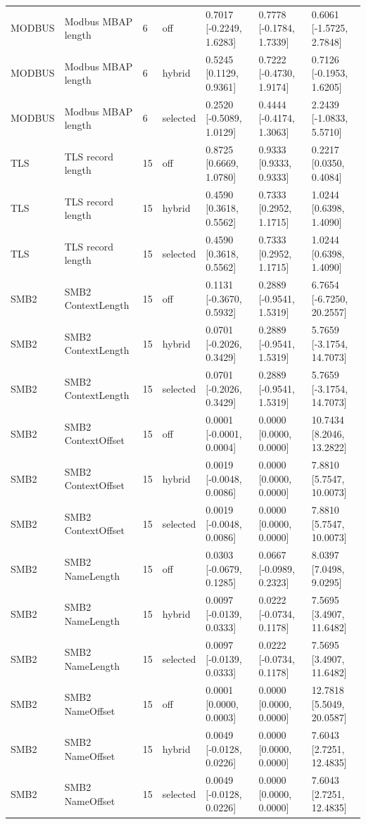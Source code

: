 \begin{tabular}{lllllll}
MODBUS & Modbus MBAP length & 6 & off & 0.7017 [-0.2249, 1.6283] & 0.7778 [-0.1784, 1.7339] & 0.6061 [-1.5725, 2.7848] \\
MODBUS & Modbus MBAP length & 6 & hybrid & 0.5245 [0.1129, 0.9361] & 0.7222 [-0.4730, 1.9174] & 0.7126 [-0.1953, 1.6205] \\
MODBUS & Modbus MBAP length & 6 & selected & 0.2520 [-0.5089, 1.0129] & 0.4444 [-0.4174, 1.3063] & 2.2439 [-1.0833, 5.5710] \\
TLS & TLS record length & 15 & off & 0.8725 [0.6669, 1.0780] & 0.9333 [0.9333, 0.9333] & 0.2217 [0.0350, 0.4084] \\
TLS & TLS record length & 15 & hybrid & 0.4590 [0.3618, 0.5562] & 0.7333 [0.2952, 1.1715] & 1.0244 [0.6398, 1.4090] \\
TLS & TLS record length & 15 & selected & 0.4590 [0.3618, 0.5562] & 0.7333 [0.2952, 1.1715] & 1.0244 [0.6398, 1.4090] \\
SMB2 & SMB2 ContextLength & 15 & off & 0.1131 [-0.3670, 0.5932] & 0.2889 [-0.9541, 1.5319] & 6.7654 [-6.7250, 20.2557] \\
SMB2 & SMB2 ContextLength & 15 & hybrid & 0.0701 [-0.2026, 0.3429] & 0.2889 [-0.9541, 1.5319] & 5.7659 [-3.1754, 14.7073] \\
SMB2 & SMB2 ContextLength & 15 & selected & 0.0701 [-0.2026, 0.3429] & 0.2889 [-0.9541, 1.5319] & 5.7659 [-3.1754, 14.7073] \\
SMB2 & SMB2 ContextOffset & 15 & off & 0.0001 [-0.0001, 0.0004] & 0.0000 [0.0000, 0.0000] & 10.7434 [8.2046, 13.2822] \\
SMB2 & SMB2 ContextOffset & 15 & hybrid & 0.0019 [-0.0048, 0.0086] & 0.0000 [0.0000, 0.0000] & 7.8810 [5.7547, 10.0073] \\
SMB2 & SMB2 ContextOffset & 15 & selected & 0.0019 [-0.0048, 0.0086] & 0.0000 [0.0000, 0.0000] & 7.8810 [5.7547, 10.0073] \\
SMB2 & SMB2 NameLength & 15 & off & 0.0303 [-0.0679, 0.1285] & 0.0667 [-0.0989, 0.2323] & 8.0397 [7.0498, 9.0295] \\
SMB2 & SMB2 NameLength & 15 & hybrid & 0.0097 [-0.0139, 0.0333] & 0.0222 [-0.0734, 0.1178] & 7.5695 [3.4907, 11.6482] \\
SMB2 & SMB2 NameLength & 15 & selected & 0.0097 [-0.0139, 0.0333] & 0.0222 [-0.0734, 0.1178] & 7.5695 [3.4907, 11.6482] \\
SMB2 & SMB2 NameOffset & 15 & off & 0.0001 [0.0000, 0.0003] & 0.0000 [0.0000, 0.0000] & 12.7818 [5.5049, 20.0587] \\
SMB2 & SMB2 NameOffset & 15 & hybrid & 0.0049 [-0.0128, 0.0226] & 0.0000 [0.0000, 0.0000] & 7.6043 [2.7251, 12.4835] \\
SMB2 & SMB2 NameOffset & 15 & selected & 0.0049 [-0.0128, 0.0226] & 0.0000 [0.0000, 0.0000] & 7.6043 [2.7251, 12.4835] \\
\hline
\end{tabular}
